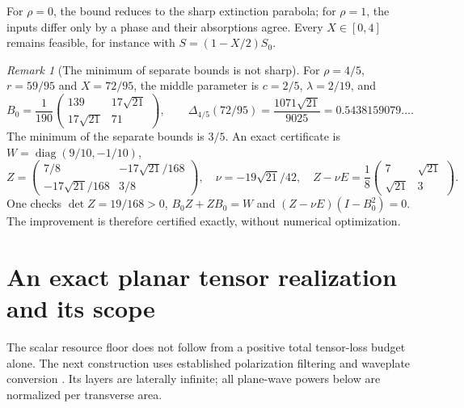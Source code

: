 \documentclass[11pt,a4paper]{article}
\theoremstyle{remark}
\newtheorem{remark}[theorem]{Remark}
\newcommand{\diag}{\operatorname{diag}}
\begin{document}
For $\rho=0$, the bound reduces to the sharp extinction parabola; for $\rho=1$, the inputs differ only by a phase and their absorptions agree. Every $X\in[0,4]$ remains feasible, for instance with $S=(1-X/2)S_0$.

\begin{remark}[The minimum of separate bounds is not sharp]
For $\rho=4/5$, $r=59/95$ and $X=72/95$, the middle parameter is $c=2/5$, $\lambda=2/19$, and
\[
 B_0=\frac1{190}\begin{pmatrix}139&17\sqrt{21}\\17\sqrt{21}&71\end{pmatrix},\qquad
 \Delta_{4/5}(72/95)=\frac{1071\sqrt{21}}{9025}=0.5438159079\ldots.
\]
The minimum of the separate bounds is $3/5$. An exact certificate is $W=\diag(9/10,-1/10)$,
\[
 Z=\begin{pmatrix}7/8&-17\sqrt{21}/168\\-17\sqrt{21}/168&3/8\end{pmatrix},\quad
 \nu=-19\sqrt{21}/42,\quad Z-\nu E=\frac18\begin{pmatrix}7&\sqrt{21}\\\sqrt{21}&3\end{pmatrix}.
\]
One checks $\det Z=19/168>0$, $B_0Z+ZB_0=W$ and $(Z-\nu E)(I-B_0^2)=0$. The improvement is therefore certified exactly, without numerical optimization.
\end{remark}

\section{An exact planar tensor realization and its scope}\label{sec:vector}
The scalar resource floor does not follow from a positive total tensor-loss budget alone. The next construction uses established polarization filtering and waveplate conversion \citep{Armitage2014,Potton2004,Khurgin2021}. Its layers are laterally infinite; all plane-wave powers below are normalized per transverse area.
\end{document}

